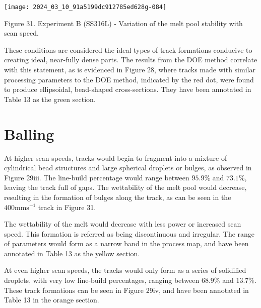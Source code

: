 \documentclass[10pt]{article}
\begin{document}
\begin{center}
\texttt{[image: 2024\_03\_10\_91a5199dc912785ed628g-084]}
\end{center}

Figure 31. Experiment B (SS316L) - Variation of the melt pool stability with scan speed.

These conditions are considered the ideal types of track formations conducive to creating ideal, near-fully dense parts. The results from the DOE method correlate with this statement, as is evidenced in Figure 28, where tracks made with similar processing parameters to the DOE method, indicated by the red dot, were found to produce ellipsoidal, bead-shaped cross-sections. They have been annotated in Table 13 as the green section.

\section*{Balling}
At higher scan speeds, tracks would begin to fragment into a mixture of cylindrical bead structures and large spherical droplets or bulges, as observed in Figure 29iii. The line-build percentage would range between $95.9 \%$ and $73.1 \%$, leaving the track full of gaps. The wettability of the melt pool would decrease, resulting in the formation of bulges along the track, as can be seen in the $400 \mathrm{mms}^{-1}$ track in Figure 31.

The wettability of the melt would decrease with less power or increased scan speed. This formation is referred as being discontinuous and irregular. The range of parameters would form as a narrow band in the process map, and have been annotated in Table 13 as the yellow section.

At even higher scan speeds, the tracks would only form as a series of solidified droplets, with very low line-build percentages, ranging between $68.9 \%$ and $13.7 \%$. These track formations can be seen in Figure 29iv, and have been annotated in Table 13 in the orange section.
\end{document}
